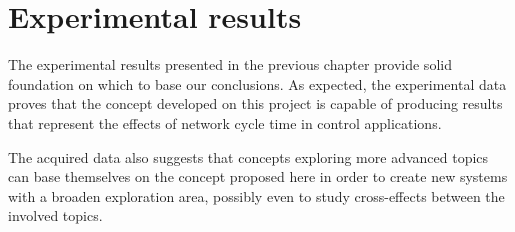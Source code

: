 \section{Experimental results} \label{sec:exp-results}
The experimental results presented in the previous chapter provide solid foundation on which to base our conclusions.
As expected, the experimental data proves that the concept developed on this project is capable of producing results that represent the effects of network cycle time in control applications.

The acquired data also suggests that concepts exploring more advanced topics can base themselves on the concept proposed here in order to create new systems with a broaden exploration area, possibly even to study cross-effects between the involved topics.

